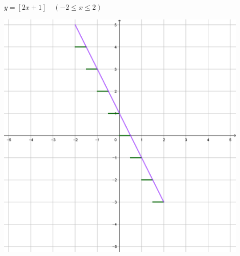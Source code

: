 \documentclass[a4paper]{oblivoir}
\begin{document}
\begin{minipage}{0.45\textwidth}\centering
\(y=[2x+1]\quad(-2\le x\le2)\)
\par\bigskip\includegraphics[width=0.9\textwidth]{img/y=[-2x+1]}
\end{minipage}\bigskip\bigskip\par
\end{document}
